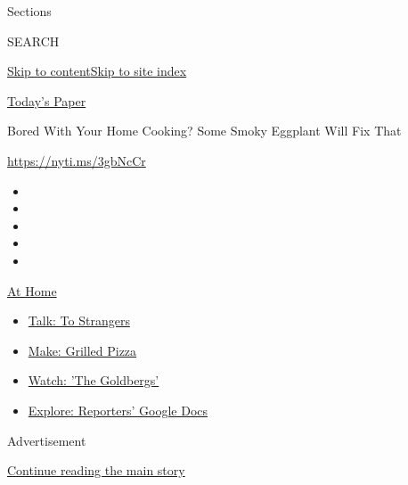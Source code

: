Sections

SEARCH

\protect\hyperlink{site-content}{Skip to
content}\protect\hyperlink{site-index}{Skip to site index}

\href{https://myaccount.nytimes3xbfgragh.onion/auth/login?response_type=cookie\&client_id=vi}{}

\href{https://www.nytimes3xbfgragh.onion/section/todayspaper}{Today's
Paper}

Bored With Your Home Cooking? Some Smoky Eggplant Will Fix That

\url{https://nyti.ms/3gbNcCr}

\begin{itemize}
\item
\item
\item
\item
\item
\end{itemize}

\href{https://www.nytimes3xbfgragh.onion/spotlight/at-home?action=click\&pgtype=Article\&state=default\&region=TOP_BANNER\&context=at_home_menu}{At
Home}

\begin{itemize}
\tightlist
\item
  \href{https://www.nytimes3xbfgragh.onion/2020/08/03/well/family/the-benefits-of-talking-to-strangers.html?action=click\&pgtype=Article\&state=default\&region=TOP_BANNER\&context=at_home_menu}{Talk:
  To Strangers}
\item
  \href{https://www.nytimes3xbfgragh.onion/2020/08/01/at-home/coronavirus-make-pizza-on-a-grill.html?action=click\&pgtype=Article\&state=default\&region=TOP_BANNER\&context=at_home_menu}{Make:
  Grilled Pizza}
\item
  \href{https://www.nytimes3xbfgragh.onion/2020/07/31/arts/television/goldbergs-abc-stream.html?action=click\&pgtype=Article\&state=default\&region=TOP_BANNER\&context=at_home_menu}{Watch:
  'The Goldbergs'}
\item
  \href{https://www.nytimes3xbfgragh.onion/interactive/2020/at-home/even-more-reporters-editors-diaries-lists-recommendations.html?action=click\&pgtype=Article\&state=default\&region=TOP_BANNER\&context=at_home_menu}{Explore:
  Reporters' Google Docs}
\end{itemize}

Advertisement

\protect\hyperlink{after-top}{Continue reading the main story}

